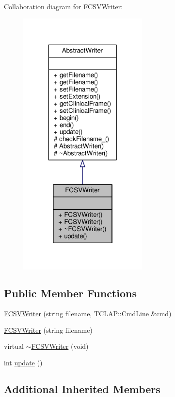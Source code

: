 Collaboration diagram for F\-C\-S\-V\-Writer\-:
\nopagebreak
\begin{figure}[H]
\begin{center}
\leavevmode
\includegraphics[width=184pt]{classFCSVWriter__coll__graph}
\end{center}
\end{figure}
\subsection*{Public Member Functions}
\begin{DoxyCompactItemize}
\item 
\hyperlink{classFCSVWriter_a149edd9e0a44bc277c00972c8f38ef79}{F\-C\-S\-V\-Writer} (string filename, T\-C\-L\-A\-P\-::\-Cmd\-Line \&cmd)
\item 
\hyperlink{classFCSVWriter_a330d506d30964c277f0b2d025e61ca26}{F\-C\-S\-V\-Writer} (string filename)
\item 
virtual \hyperlink{classFCSVWriter_aa73bd2305a61f453953ec9c2f976f10c}{$\sim$\-F\-C\-S\-V\-Writer} (void)
\item 
int \hyperlink{classFCSVWriter_a23b5071a6eda497f4ce7872c6af6ae5c}{update} ()
\end{DoxyCompactItemize}
\subsection*{Additional Inherited Members}


